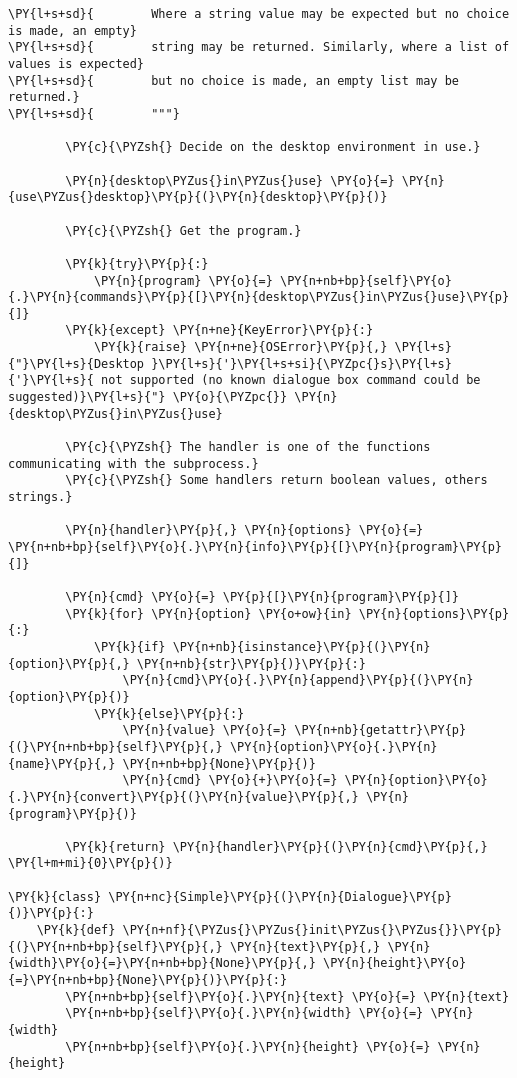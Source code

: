 \begin{Verbatim}[commandchars=\\\{\}]
\PY{l+s+sd}{        Where a string value may be expected but no choice is made, an empty}
\PY{l+s+sd}{        string may be returned. Similarly, where a list of values is expected}
\PY{l+s+sd}{        but no choice is made, an empty list may be returned.}
\PY{l+s+sd}{        """}

        \PY{c}{\PYZsh{} Decide on the desktop environment in use.}

        \PY{n}{desktop\PYZus{}in\PYZus{}use} \PY{o}{=} \PY{n}{use\PYZus{}desktop}\PY{p}{(}\PY{n}{desktop}\PY{p}{)}

        \PY{c}{\PYZsh{} Get the program.}

        \PY{k}{try}\PY{p}{:}
            \PY{n}{program} \PY{o}{=} \PY{n+nb+bp}{self}\PY{o}{.}\PY{n}{commands}\PY{p}{[}\PY{n}{desktop\PYZus{}in\PYZus{}use}\PY{p}{]}
        \PY{k}{except} \PY{n+ne}{KeyError}\PY{p}{:}
            \PY{k}{raise} \PY{n+ne}{OSError}\PY{p}{,} \PY{l+s}{"}\PY{l+s}{Desktop }\PY{l+s}{'}\PY{l+s+si}{\PYZpc{}s}\PY{l+s}{'}\PY{l+s}{ not supported (no known dialogue box command could be suggested)}\PY{l+s}{"} \PY{o}{\PYZpc{}} \PY{n}{desktop\PYZus{}in\PYZus{}use}

        \PY{c}{\PYZsh{} The handler is one of the functions communicating with the subprocess.}
        \PY{c}{\PYZsh{} Some handlers return boolean values, others strings.}

        \PY{n}{handler}\PY{p}{,} \PY{n}{options} \PY{o}{=} \PY{n+nb+bp}{self}\PY{o}{.}\PY{n}{info}\PY{p}{[}\PY{n}{program}\PY{p}{]}

        \PY{n}{cmd} \PY{o}{=} \PY{p}{[}\PY{n}{program}\PY{p}{]}
        \PY{k}{for} \PY{n}{option} \PY{o+ow}{in} \PY{n}{options}\PY{p}{:}
            \PY{k}{if} \PY{n+nb}{isinstance}\PY{p}{(}\PY{n}{option}\PY{p}{,} \PY{n+nb}{str}\PY{p}{)}\PY{p}{:}
                \PY{n}{cmd}\PY{o}{.}\PY{n}{append}\PY{p}{(}\PY{n}{option}\PY{p}{)}
            \PY{k}{else}\PY{p}{:}
                \PY{n}{value} \PY{o}{=} \PY{n+nb}{getattr}\PY{p}{(}\PY{n+nb+bp}{self}\PY{p}{,} \PY{n}{option}\PY{o}{.}\PY{n}{name}\PY{p}{,} \PY{n+nb+bp}{None}\PY{p}{)}
                \PY{n}{cmd} \PY{o}{+}\PY{o}{=} \PY{n}{option}\PY{o}{.}\PY{n}{convert}\PY{p}{(}\PY{n}{value}\PY{p}{,} \PY{n}{program}\PY{p}{)}

        \PY{k}{return} \PY{n}{handler}\PY{p}{(}\PY{n}{cmd}\PY{p}{,} \PY{l+m+mi}{0}\PY{p}{)}

\PY{k}{class} \PY{n+nc}{Simple}\PY{p}{(}\PY{n}{Dialogue}\PY{p}{)}\PY{p}{:}
    \PY{k}{def} \PY{n+nf}{\PYZus{}\PYZus{}init\PYZus{}\PYZus{}}\PY{p}{(}\PY{n+nb+bp}{self}\PY{p}{,} \PY{n}{text}\PY{p}{,} \PY{n}{width}\PY{o}{=}\PY{n+nb+bp}{None}\PY{p}{,} \PY{n}{height}\PY{o}{=}\PY{n+nb+bp}{None}\PY{p}{)}\PY{p}{:}
        \PY{n+nb+bp}{self}\PY{o}{.}\PY{n}{text} \PY{o}{=} \PY{n}{text}
        \PY{n+nb+bp}{self}\PY{o}{.}\PY{n}{width} \PY{o}{=} \PY{n}{width}
        \PY{n+nb+bp}{self}\PY{o}{.}\PY{n}{height} \PY{o}{=} \PY{n}{height}


\end{Verbatim}
